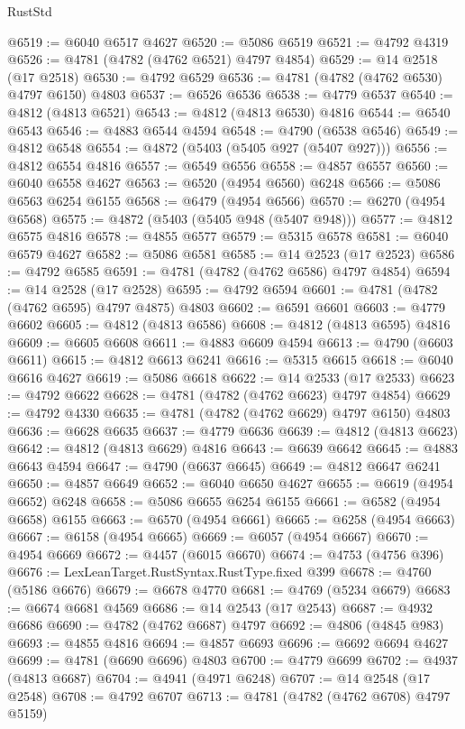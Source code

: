 \begin{lexlean}{RustStd}
\begin{coremodule}
@6519 := @6040 @6517 @4627
@6520 := @5086 @6519
@6521 := @4792 @4319
@6526 := @4781 (@4782 (@4762 @6521) @4797 @4854)
@6529 := @14 @2518 (@17 @2518)
@6530 := @4792 @6529
@6536 := @4781 (@4782 (@4762 @6530) @4797 @6150) @4803
@6537 := @6526 @6536
@6538 := @4779 @6537
@6540 := @4812 (@4813 @6521)
@6543 := @4812 (@4813 @6530) @4816
@6544 := @6540 @6543
@6546 := @4883 @6544 @4594
@6548 := @4790 (@6538 @6546)
@6549 := @4812 @6548
@6554 := @4872 (@5403 (@5405 @927 (@5407 @927)))
@6556 := @4812 @6554 @4816
@6557 := @6549 @6556
@6558 := @4857 @6557
@6560 := @6040 @6558 @4627
@6563 := @6520 (@4954 @6560) @6248
@6566 := @5086 @6563 @6254 @6155
@6568 := @6479 (@4954 @6566)
@6570 := @6270 (@4954 @6568)
@6575 := @4872 (@5403 (@5405 @948 (@5407 @948)))
@6577 := @4812 @6575 @4816
@6578 := @4855 @6577
@6579 := @5315 @6578
@6581 := @6040 @6579 @4627
@6582 := @5086 @6581
@6585 := @14 @2523 (@17 @2523)
@6586 := @4792 @6585
@6591 := @4781 (@4782 (@4762 @6586) @4797 @4854)
@6594 := @14 @2528 (@17 @2528)
@6595 := @4792 @6594
@6601 := @4781 (@4782 (@4762 @6595) @4797 @4875) @4803
@6602 := @6591 @6601
@6603 := @4779 @6602
@6605 := @4812 (@4813 @6586)
@6608 := @4812 (@4813 @6595) @4816
@6609 := @6605 @6608
@6611 := @4883 @6609 @4594
@6613 := @4790 (@6603 @6611)
@6615 := @4812 @6613 @6241
@6616 := @5315 @6615
@6618 := @6040 @6616 @4627
@6619 := @5086 @6618
@6622 := @14 @2533 (@17 @2533)
@6623 := @4792 @6622
@6628 := @4781 (@4782 (@4762 @6623) @4797 @4854)
@6629 := @4792 @4330
@6635 := @4781 (@4782 (@4762 @6629) @4797 @6150) @4803
@6636 := @6628 @6635
@6637 := @4779 @6636
@6639 := @4812 (@4813 @6623)
@6642 := @4812 (@4813 @6629) @4816
@6643 := @6639 @6642
@6645 := @4883 @6643 @4594
@6647 := @4790 (@6637 @6645)
@6649 := @4812 @6647 @6241
@6650 := @4857 @6649
@6652 := @6040 @6650 @4627
@6655 := @6619 (@4954 @6652) @6248
@6658 := @5086 @6655 @6254 @6155
@6661 := @6582 (@4954 @6658) @6155
@6663 := @6570 (@4954 @6661)
@6665 := @6258 (@4954 @6663)
@6667 := @6158 (@4954 @6665)
@6669 := @6057 (@4954 @6667)
@6670 := @4954 @6669
@6672 := @4457 (@6015 @6670)
@6674 := @4753 (@4756 @396)
@6676 := LexLeanTarget.RustSyntax.RustType.fixed @399
@6678 := @4760 (@5186 @6676)
@6679 := @6678 @4770
@6681 := @4769 (@5234 @6679)
@6683 := @6674 @6681 @4569
@6686 := @14 @2543 (@17 @2543)
@6687 := @4932 @6686
@6690 := @4782 (@4762 @6687) @4797
@6692 := @4806 (@4845 @983)
@6693 := @4855 @4816
@6694 := @4857 @6693
@6696 := @6692 @6694 @4627
@6699 := @4781 (@6690 @6696) @4803
@6700 := @4779 @6699
@6702 := @4937 (@4813 @6687)
@6704 := @4941 (@4971 @6248)
@6707 := @14 @2548 (@17 @2548)
@6708 := @4792 @6707
@6713 := @4781 (@4782 (@4762 @6708) @4797 @5159)

\end{coremodule}
\end{lexlean}
